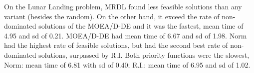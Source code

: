 On the Lunar Landing problem, MRDL found less feasible solutions than any variant (besides the random). On the other hand, it exceed the rate of non-dominated solutions of the MOEA/D-DE and it was the fastest, mean time of 4.95 and sd of 0.21. MOEA/D-DE had mean time of 6.67 and sd of 1.98. Norm had the highest rate of feasible solutions, but had the second best rate of non-dominated solutions, surpassed by R.I. Both priority functions were the slowest, Norm: mean time of 6.81 with sd of 0.40; R.I.: mean time of 6.95 and sd of 1.02.


















